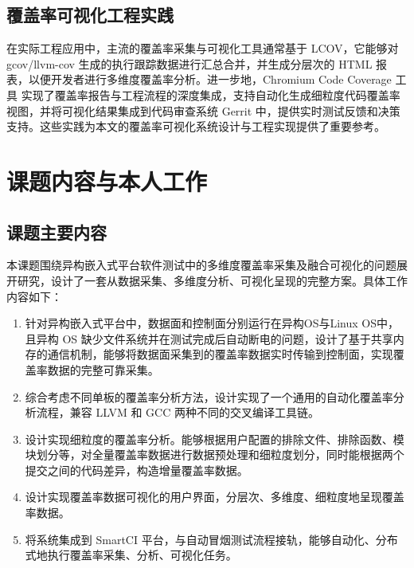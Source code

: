 \subsection{覆盖率可视化工程实践}
    在实际工程应用中，主流的覆盖率采集与可视化工具通常基于 LCOV\cite{lcov_github}，它能够对 gcov/llvm-cov 生成的执行跟踪数据进行汇总合并，并生成分层次的 HTML 报表，以便开发者进行多维度覆盖率分析。进一步地，Chromium Code Coverage 工具\cite{chromium_coverage} 实现了覆盖率报告与工程流程的深度集成，支持自动化生成细粒度代码覆盖率视图，并将可视化结果集成到代码审查系统 Gerrit 中，提供实时测试反馈和决策支持。这些实践为本文的覆盖率可视化系统设计与工程实现提供了重要参考。

\section{课题内容与本人工作}
\subsection{课题主要内容}
    本课题围绕异构嵌入式平台软件测试中的多维度覆盖率采集及融合可视化的问题展开研究，设计了一套从数据采集、多维度分析、可视化呈现的完整方案。具体工作内容如下：
    \begin{enumerate}
        \item 针对异构嵌入式平台中，数据面和控制面分别运行在异构OS与Linux OS中，且异构 OS 缺少文件系统并在测试完成后自动断电的问题，设计了基于共享内存的通信机制，能够将数据面采集到的覆盖率数据实时传输到控制面，实现覆盖率数据的完整可靠采集。
        \item 综合考虑不同单板的覆盖率分析方法，设计实现了一个通用的自动化覆盖率分析流程，兼容 LLVM 和 GCC 两种不同的交叉编译工具链。
        \item 设计实现细粒度的覆盖率分析。能够根据用户配置的排除文件、排除函数、模块划分等，对全量覆盖率数据进行数据预处理和细粒度划分，同时能根据两个提交之间的代码差异，构造增量覆盖率数据。
        \item 设计实现覆盖率数据可视化的用户界面，分层次、多维度、细粒度地呈现覆盖率数据。
        \item 将系统集成到 SmartCI 平台，与自动冒烟测试流程接轨，能够自动化、分布式地执行覆盖率采集、分析、可视化任务。
    \end{enumerate}

